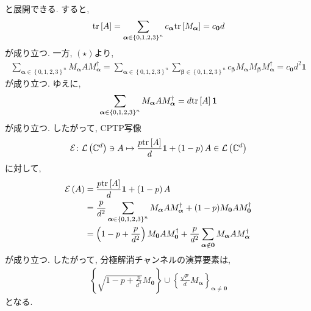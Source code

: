 \begin{ex}
\begin{align*}
    \end{align*}
    と展開できる. すると,
    \begin{align*}
        \mathrm{tr}\left[A\right] = \sum_{\bm{\alpha} \in \left\{0,1,2,3\right\}^n} c_{\bm{\alpha}} \mathrm{tr}\left[M_{\bm{\alpha}}\right]
        =
        c_{\bm{0}}d
    \end{align*}
    が成り立つ. 一方, $(\star)$より,
    \begin{align*}
        \sum_{\bm{\alpha} \in \left\{0,1,2,3\right\}^n}
        M_{\bm{\alpha}} A M_{\bm{\alpha}}^\dagger
        =
        \sum_{\bm{\alpha} \in \left\{0,1,2,3\right\}^n}
        \sum_{\bm{\beta} \in \left\{0,1,2,3\right\}^n}
        c_{\bm{\beta}}
        M_{\bm{\alpha}} M_{\bm{\beta}} M_{\bm{\alpha}}^\dagger
        =
        c_{\bm{0}}d^2 \mathbf{1}
    \end{align*}
    が成り立つ. ゆえに,
    \begin{align*}
        \sum_{\bm{\alpha} \in \left\{0,1,2,3\right\}^n}
        M_{\bm{\alpha}} A M_{\bm{\alpha}}^\dagger
        =
        d \mathrm{tr}\left[A\right]\mathbf{1}
    \end{align*}
    が成り立つ. したがって, CPTP写像
    \begin{align*}
        \mathcal{E} \colon \mathcal{L}\left({\mathbb{C}^{d}}\right) \ni A \mapsto \frac{p \mathrm{tr}\left[ A\right]}{d}\mathbf{1} + \left(1-p\right)A \in \mathcal{L}\left({\mathbb{C}^{d}}\right)
    \end{align*}
    に対して,
    \begin{align*}
        \mathcal{E} \left(A\right)
         & =
        \frac{p \mathrm{tr}\left[ A\right]}{d}\mathbf{1} + \left(1-p\right)A
        \\
         & =
        \frac{p}{d^2}
        \sum_{\bm{\alpha} \in \left\{0,1,2,3\right\}^n}
        M_{\bm{\alpha}} A M_{\bm{\alpha}}^\dagger
        +
        (1-p)
        M_{\bm{0}} A M_{\bm{0}}^\dagger
        \\
         & =
        \left( 1 - p + \frac{p}{d^2}\right)
        M_{\bm{0}} A M_{\bm{0}}^\dagger
        +
        \frac{p}{d^2}
        \sum_{\bm{\alpha} \notin \bm{0}}
        M_{\bm{\alpha}} A M_{\bm{\alpha}}^\dagger
    \end{align*}
    が成り立つ. したがって, 分極解消チャンネルの演算要素は,
    \begin{align*}
        \left\{
        \sqrt{1-p+\frac{p}{d^2}} M_{\bm{0}}
        \right\}
        \cup
        \left\{
        \frac{\sqrt{p}}{d} M_{\bm{\alpha}}
        \right\}_{\bm{\alpha}\neq\bm{0}}
    \end{align*}
    となる.
\end{ex}

